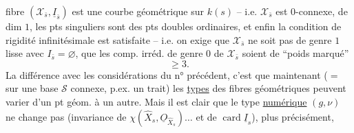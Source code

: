 fibre $(\mathcal X_{\bar s},\underline I_{\bar s})$ est une courbe géométrique sur $k(s)$ -- i.e. $\mathcal X_{\bar s}$ est $0$-connexe, de dim $1$,  les pts singuliers sont  des pts doubles ordinaires, et enfin la condition de rigidité infinitésimale  est satisfaite --  i.e. on exige que $\mathcal X_{\bar s}$ ne soit pas de genre $1$ lisse avec $I_{\bar s}=\varnothing$,  que les comp. irréd. de genre $0$ de $\mathcal X_{\bar s}$ soient de ``poids marqué''
\[
\geq 3.
\]
La différence avec les considérations du n° précédent, c'est que maintenant ($=$ sur une base $\mathcal S$ connexe, p.ex.  un trait) les \uline{types} des fibres géométriques peuvent varier d'un pt géom. à un autre. Mais il est clair que le type \uline{numérique} $(g,\nu)$ ne change pas (invariance de $\chi(\widehat X_s,\underline O_{\widehat X_s})\ldots$ et de $\operatorname{card}\underline I_s$), plus précisément,
